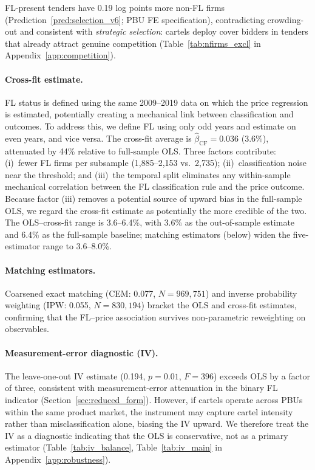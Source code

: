 

FL-present tenders have 0.19 log points more non-FL firms
(Prediction~\ref{pred:selection_v6}; PBU FE specification),
contradicting crowding-out and consistent with \emph{strategic
selection}: cartels deploy cover bidders in tenders that already attract
genuine competition
(Table~\ref{tab:nfirms_excl} in Appendix~\ref{app:competition}).

\paragraph{Cross-fit estimate.}
FL status is defined using the same 2009--2019 data on which the price
regression is estimated, potentially creating a mechanical link between
classification and outcomes. To address this, we define FL using only
odd years and estimate on even years, and vice versa. The cross-fit
average is $\hat{\beta}_{\text{CF}} = 0.036$ (3.6\%), attenuated by
44\% relative to full-sample OLS. Three factors contribute:
(i)~fewer FL firms per subsample (1,885--2,153 vs.\ 2,735);
(ii)~classification noise near the threshold; and (iii)~the temporal
split eliminates any within-sample mechanical correlation between
the FL classification rule and the price outcome. Because factor
(iii) removes a potential source of upward bias in the full-sample
OLS, we regard the cross-fit estimate as potentially the more
credible of the two. The OLS--cross-fit range is 3.6--6.4\%, with
3.6\% as the out-of-sample estimate and 6.4\% as the full-sample
baseline; matching estimators (below) widen the five-estimator range
to 3.6--8.0\%.

\paragraph{Matching estimators.}
Coarsened exact matching (CEM: 0.077, $N = 969{,}751$) and inverse
probability weighting (IPW: 0.055, $N = 830{,}194$) bracket the OLS
and cross-fit estimates, confirming that the FL--price association
survives non-parametric reweighting on observables.

\paragraph{Measurement-error diagnostic (IV).}
The leave-one-out IV estimate (0.194, $p = 0.01$, $F = 396$) exceeds
OLS by a factor of three, consistent with measurement-error
attenuation in the binary FL indicator
(Section~\ref{sec:reduced_form}). However, if cartels operate across
PBUs within the same product market, the instrument may capture cartel
intensity rather than misclassification alone, biasing the IV upward.
We therefore treat the IV as a diagnostic indicating that the OLS is
conservative, not as a primary estimator
(Table~\ref{tab:iv_balance}, Table~\ref{tab:iv_main} in
Appendix~\ref{app:robustness}).

